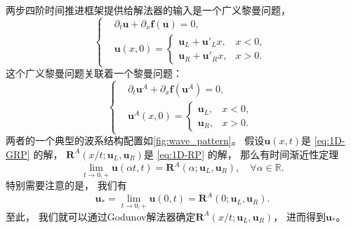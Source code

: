 两步四阶时间推进框架提供给解法器的输入是一个广义黎曼问题，
\begin{equation}
  \label{eq:1D-GRP}
  \left\{
  \begin{aligned}
     & {\partial_{t}}{\bm{u}} + {\partial_{x}}{\bm{f}}({\bm{u}}) = 0, \\
     & {\bm{u}}(x,0) =
    \begin{cases}
      \bm u_L + \bm u'_L x, & x<0,  \\
      \bm u_R + \bm u'_R x, & x>0.
    \end{cases}
  \end{aligned}
  \right.
\end{equation}
这个广义黎曼问题关联着一个黎曼问题：
\begin{equation}
  \label{eq:1D-RP}
  \left\{
  \begin{aligned}
     & {\partial_{t}}{\bm{u}^A} + {\partial_{x}}{\bm{f}}({\bm{u}^A}) = 0, \\
     & {\bm{u}^A}(x,0) =
    \begin{cases}
      \bm u_L, & x<0,  \\
      \bm u_R, & x>0.
    \end{cases}
  \end{aligned}
  \right.
\end{equation}
两者的一个典型的波系结构配置如\cref{fig:wave_pattern}。
假设${\bm u}(x,t)$是 \cref{eq:1D-GRP} 的解，
${\bm R}^A\left(x/t;\bm u_L,\bm u_R\right)$是 \cref{eq:1D-RP} 的解，
那么有时间渐近性定理
\begin{equation}
  \lim_{t\to 0,+} {\bm u}(\alpha t,t) = {\bm R}^A\left(\alpha;\bm u_L,\bm u_R\right), \quad \forall\alpha\in\mathbb{R}.
\end{equation}
特别需要注意的是，
我们有
\begin{equation}
  \bm u_* = \lim_{t\to 0,+} {\bm u}(0,t) = {\bm R}^A\left(0;\bm u_L,\bm u_R\right).
\end{equation}
至此，
我们就可以通过Godunov解法器确定${\bm R}^A\left(x/t;\bm u_L,\bm u_R\right)$，
进而得到$\bm u_*$。

